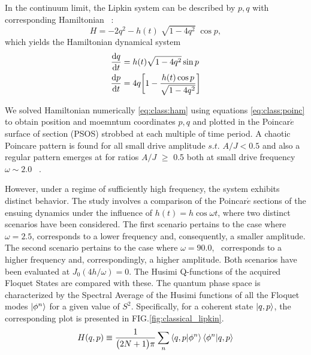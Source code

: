\documentclass[%
reprint,
superscriptaddress,
amsmath,amssymb,
aps,
prb,
showkeys,
]{revtex4-2}
\begin{document}
	In the continuum limit, the Lipkin system can be described by $p,q$ with corresponding Hamiltonian ~\cite{sciolla_quantum_2010}:
	\begin{equation}
	H = -2 q^2 - h(t)\;\sqrt{1-4q^2}\;\cos{p},
	\label{eq:class:ham}
	\end{equation}
	which yields the Hamiltonian dynamical system 
	\begin{align}
		\dv{q}{t} &= h(t)\sqrt{1-4q^2}\sin{p}\nonumber \\
		\dv{p}{t} &= 4q\bigg[1-\frac{h(t)\cos{p}}{\sqrt{1-4q^2}}\bigg]
		\label{eq:class:poinc}
	\end{align}
	
	We solved Hamiltonian numerically \ref{eq:class:ham} using equations \ref{eq:class:poinc} to obtain position and moemntum coordinates $p,q$ and plotted in the Poincar$\acute{e}$ surface of section (PSOS) strobbed at each multiple of time period. A chaotic Poincare pattern is found for all small drive amplitude $s.t.$  $A/J < 0.5 $ and also a regular pattern emerges at for ratios $A/J$ $\geq$ 0.5 both at small drive frequency $\omega \sim 2.0$ ~\cite{russomanno_thermalization_2015}. 
	
	However, under a regime of sufficiently high frequency, the system exhibits distinct behavior. The study involves a comparison of the Poincar$\acute{e}$ sections of the ensuing dynamics under the influence of $h(t)=h\cos{\omega t}$, where two distinct scenarios have been considered. The first scenario pertains to the case where $\omega=2.5$, corresponds to a lower frequency and, consequently, a smaller amplitude. The second scenario pertains to the case where $\omega=90.0$,  corresponds to a higher frequency and, correspondingly, a higher amplitude. Both scenarios have been evaluated at $J_0(4h/\omega)=0$. The Husimi Q-functions of the acquired Floquet States are compared with these. The quantum phase space is characterized by the Spectral Average of the Husimi functions of all the Floquet modes $\ket{\phi^n}$ for a given value of $S^2$. Specifically, for a coherent state $\ket{q,p}$, the corresponding plot is presented in FIG.\ref{fig:classical_lipkin}.
	\begin{equation*}
		H(q,p)\equiv \frac{1}{\big(2N+1\big)\pi}\sum_n \ip{q,p}{\phi^n}\ip{\phi^n}{q,p}
	\end{equation*}
	
\end{document}
